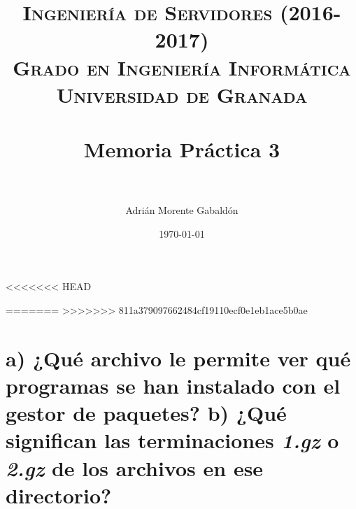 


\title{
\normalfont \normalsize
\textsc{\textbf{Ingeniería de Servidores (2016-2017)} \\ Grado en Ingeniería Informática \\ Universidad de Granada} \\ [25pt] %
\horrule{0.5pt} \\[0.4cm] %
\huge Memoria Práctica 3 \\ %
\horrule{2pt} \\[0.5cm] %
}

\author{Adrián Morente Gabaldón} %

\date{\normalsize\today} %




\maketitle %

\newpage %

\tableofcontents %

<<<<<<< HEAD
\newpage

=======
>>>>>>> 811a379097662484cf19110ecf0e1eb1ace5b0ae
\listoffigures

\listoftables

\newpage


\section{a) ¿Qué archivo le permite ver qué programas se han instalado con el gestor de paquetes? b) ¿Qué significan las terminaciones \emph{1.gz} o \emph{2.gz} de los archivos en ese directorio?}

